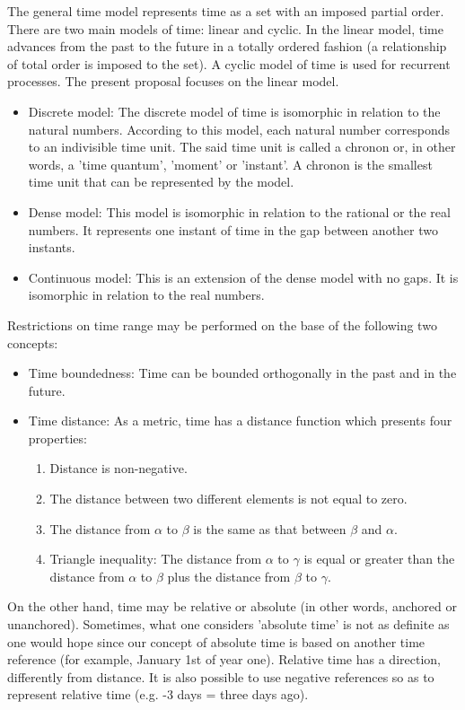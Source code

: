 The general time model represents time as a set with an imposed partial order. There are two main models of time: linear and cyclic. In the linear model, time advances from the past to the future in a totally ordered fashion (a relationship of total order is imposed to the set). A cyclic model of time is used for recurrent processes. The present proposal focuses on the linear model.
\begin{itemize}
\item
Discrete model:  The discrete model of time is isomorphic in relation to the natural numbers. According to this model, each natural number corresponds to an indivisible time unit. The said time unit is called a chronon or, in other words, a 'time quantum', 'moment' or 'instant'. A chronon is the smallest time unit that can be represented by the model.
\item
Dense model: This model is isomorphic in relation to the rational or the real numbers. It represents one instant of time in the gap between another two instants.
\item
Continuous model: This is an extension of the dense model with no gaps. It is isomorphic in relation to the real numbers.
\end{itemize}
Restrictions on time range may be performed on the base of the following two concepts:
\begin{itemize}
\item
Time boundedness: Time can be bounded orthogonally in the past and in the future.
\item
Time distance: As a metric, time has a distance function which presents four properties:
\begin{enumerate}
\item
Distance is non-negative.
\item
The distance between two different elements is not equal to zero.
\item
The distance from $\alpha$ to $\beta$ is the same as that between $\beta$ and $\alpha$.
\item
Triangle inequality: The distance from $\alpha$ to $\gamma$ is equal or greater than the distance from $\alpha$ to $\beta$ plus the distance from $\beta$ to $\gamma$.
\end{enumerate}
\end{itemize}
On the other hand, time may be relative or absolute (in other words, anchored or unanchored). Sometimes, what one considers 'absolute time' is not as definite as one would hope since our concept of absolute time is based on another time reference (for example, January 1st of year one). Relative time has a direction, differently from distance. It is also possible to use negative references so as to represent relative time (e.g. -3 days = three days ago).


